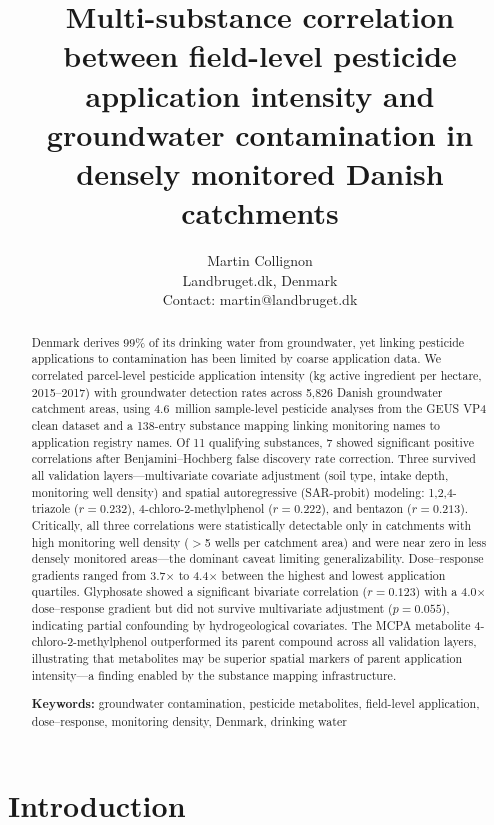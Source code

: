 \documentclass[12pt,a4paper]{article}
\title{\textbf{Multi-substance correlation between field-level pesticide application intensity and groundwater contamination in densely monitored Danish catchments}}
\author{Martin Collignon\\[6pt]
Landbruget.dk, Denmark\\[3pt]
\small Contact: martin@landbruget.dk}
\date{}
\begin{document}
\maketitle
\thispagestyle{fancy}

\begin{abstract}
Denmark derives 99\% of its drinking water from groundwater, yet linking pesticide applications to contamination has been limited by coarse application data. We correlated parcel-level pesticide application intensity (kg active ingredient per hectare, 2015--2017) with groundwater detection rates across 5,826 Danish groundwater catchment areas, using 4.6~million sample-level pesticide analyses from the GEUS VP4 clean dataset and a 138-entry substance mapping linking monitoring names to application registry names. Of 11 qualifying substances, 7 showed significant positive correlations after Benjamini--Hochberg false discovery rate correction. Three survived all validation layers---multivariate covariate adjustment (soil type, intake depth, monitoring well density) and spatial autoregressive (SAR-probit) modeling: 1,2,4-triazole ($r = 0.232$), 4-chloro-2-methylphenol ($r = 0.222$), and bentazon ($r = 0.213$). Critically, all three correlations were statistically detectable only in catchments with high monitoring well density ($>$5 wells per catchment area) and were near zero in less densely monitored areas---the dominant caveat limiting generalizability. Dose--response gradients ranged from 3.7$\times$ to 4.4$\times$ between the highest and lowest application quartiles. Glyphosate showed a significant bivariate correlation ($r = 0.123$) with a 4.0$\times$ dose--response gradient but did not survive multivariate adjustment ($p = 0.055$), indicating partial confounding by hydrogeological covariates. The MCPA metabolite 4-chloro-2-methylphenol outperformed its parent compound across all validation layers, illustrating that metabolites may be superior spatial markers of parent application intensity---a finding enabled by the substance mapping infrastructure.

\medskip
\noindent\textbf{Keywords:} groundwater contamination, pesticide metabolites, field-level application, dose--response, monitoring density, Denmark, drinking water
\end{abstract}

\clearpage
\tableofcontents
\clearpage

\section{Introduction}
\end{document}

